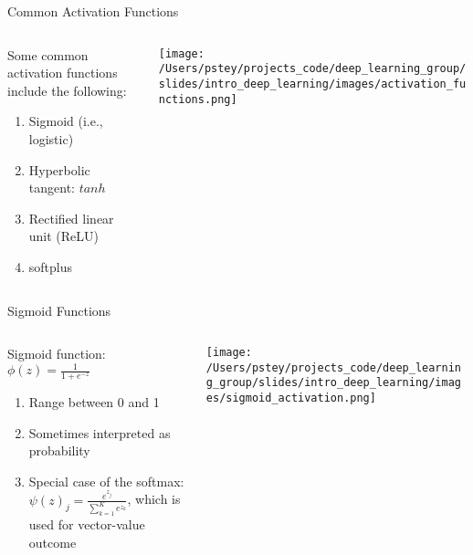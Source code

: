 \documentclass[pdf]{beamer}
\begin{document}
	
	\begin{frame}{Common Activation Functions}
	\begin{columns}
	\begin{column}{0.5\textwidth}
	Some common activation functions include the following: 
	\vspace{1em}
	\begin{enumerate}
		\item Sigmoid (i.e., logistic)
		\item Hyperbolic tangent: $tanh$
		\item Rectified linear unit (ReLU)
		\item softplus
	\end{enumerate}
	\end{column}
	
	\begin{column}{0.5\textwidth}
	\begin{center}
		\texttt{[image: /Users/pstey/projects\_code/deep\_learning\_group/slides/intro\_deep\_learning/images/activation\_functions.png]}
	\end{center}
	\end{column}
	\end{columns}
	\end{frame}

	\begin{frame}{Sigmoid Functions}
	\begin{columns}
	\begin{column}{0.5\textwidth}
	Sigmoid function: $\phi(z) = \frac{1}{1 + e^{-z}}$
	\vspace{1em}
	\begin{enumerate}
		\item Range between 0 and 1
		\item Sometimes interpreted as probability
		\item Special case of the softmax: $\psi(z)_j = \frac{e^{z_j}}{\sum_{k = 1}^K e^{z_k}}$, which is used for vector-value outcome
	\end{enumerate}
	\end{column}
	
	\begin{column}{0.5\textwidth}
	\begin{center}
		\texttt{[image: /Users/pstey/projects\_code/deep\_learning\_group/slides/intro\_deep\_learning/images/sigmoid\_activation.png]}
	\end{center}
	\end{column}
	\end{columns}
	\end{frame}
\end{document}
